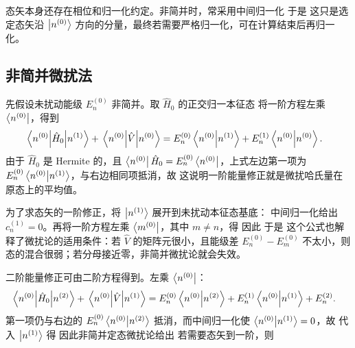 态矢本身还存在相位和归一化约定。非简并时，常采用中间归一化
于是
这只是选定态矢沿 $\ket{n^{(0)}}$ 方向的分量，最终若需要严格归一化，可在计算结束后再归一化。

\subsection{非简并微扰法}

先假设未扰动能级 $E_n^{(0)}$ 非简并。取 $\hat H_0$ 的正交归一本征态
将一阶方程左乘 $\bra{n^{(0)}}$，得到
\begin{align*}
    \mel{n^{(0)}}{\hat H_0}{n^{(1)}}
    +
    \mel{n^{(0)}}{\hat V}{n^{(0)}}
    &=
    E_n^{(0)}\ip{n^{(0)}}{n^{(1)}}
    +
    E_n^{(1)}\ip{n^{(0)}}{n^{(0)}}.
\end{align*}
由于 $\hat H_0$ 是 Hermite 的，且 $\bra{n^{(0)}}\hat H_0=E_n^{(0)}\bra{n^{(0)}}$，上式左边第一项为 $E_n^{(0)}\ip{n^{(0)}}{n^{(1)}}$，与右边相同项抵消，故
这说明一阶能量修正就是微扰哈氏量在原态上的平均值。

为了求态矢的一阶修正，将 $\ket{n^{(1)}}$ 展开到未扰动本征态基底：
中间归一化给出 $c_n^{(1)}=0$。再将一阶方程左乘 $\bra{m^{(0)}}$，其中 $m\neq n$，得
因此
于是
这个公式也解释了微扰论的适用条件：若 $\hat V$ 的矩阵元很小，且能级差 $E_n^{(0)}-E_m^{(0)}$ 不太小，则态的混合很弱；若分母接近零，非简并微扰论就会失效。

二阶能量修正可由二阶方程得到。左乘 $\bra{n^{(0)}}$：
\begin{align*}
    \mel{n^{(0)}}{\hat H_0}{n^{(2)}}
    +
    \mel{n^{(0)}}{\hat V}{n^{(1)}}
    &=
    E_n^{(0)}\ip{n^{(0)}}{n^{(2)}}
    +
    E_n^{(1)}\ip{n^{(0)}}{n^{(1)}}
    +
    E_n^{(2)}.
\end{align*}
第一项仍与右边的 $E_n^{(0)}\ip{n^{(0)}}{n^{(2)}}$ 抵消，而中间归一化使 $\ip{n^{(0)}}{n^{(1)}}=0$，故
代入 $\ket{n^{(1)}}$ 得
因此非简并定态微扰论给出
若需要态矢到一阶，则

